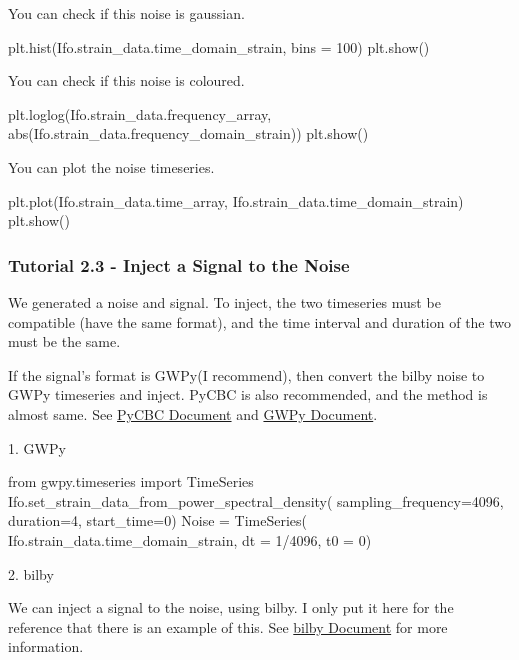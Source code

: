 You can check if this noise is gaussian.

\begin{python}[python3]
    plt.hist(Ifo.strain_data.time_domain_strain, bins = 100)
    plt.show()
\end{python}

You can check if this noise is coloured.

\begin{python}[python3]
    plt.loglog(Ifo.strain_data.frequency_array, abs(Ifo.strain_data.frequency_domain_strain))
    plt.show()
\end{python}

You can plot the noise timeseries.

\begin{python}[python3]
    plt.plot(Ifo.strain_data.time_array, Ifo.strain_data.time_domain_strain)
    plt.show()
\end{python}

\subsubsection{Tutorial 2.3 - Inject a Signal to the Noise}

We generated a noise and signal. To inject, the two timeseries must be compatible (have the same format), and the time interval and duration of the two must be the same.

If the signal's format is GWPy(I recommend), then convert the bilby noise to GWPy timeseries and inject. PyCBC is also recommended, and the method is almost same. See \href{https://pycbc.org/pycbc/latest/html/modules.html}{PyCBC Document} and \href{https://gwpy.github.io/docs/stable/}{GWPy Document}.

1. GWPy

\begin{python}[python3]
    from gwpy.timeseries import TimeSeries
    Ifo.set_strain_data_from_power_spectral_density(
        sampling_frequency=4096,
        duration=4,
        start_time=0)
    Noise = TimeSeries(
        Ifo.strain_data.time_domain_strain,
        dt = 1/4096,
        t0 = 0)
\end{python}

2. bilby

We can inject a signal to the noise, using bilby. I only put it here for the reference that there is an example of this. See \href{https://lscsoft.docs.ligo.org/bilby/api/bilby.gw.detector.inject_signal_into_gwpy_timeseries.html}{bilby Document} for more information.

